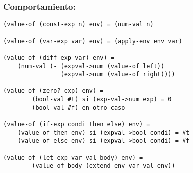 \documentclass[11pt]{article}
\begin{document}
\subsubsection*{Comportamiento:}
\begin{lstlisting}
(value-of (const-exp n) env) = (num-val n)

(value-of (var-exp var) env) = (apply-env env var)

(value-of (diff-exp var) env) = 
	(num-val (- (expval->num (value-of left))
				(expval->num (value-of right))))
				
(value-of (zero? exp) env) = 
		(bool-val #t) si (exp-val->num exp) = 0
		(bool-val #f) en otro caso		

(value-of (if-exp condi then else) env) =
	(value-of then env) si (expval->bool condi) = #t
	(value-of else env) si (expval->bool condi) = #f 	
	
(value-of (let-exp var val body) env) = 
		(value-of body (extend-env var val env))
\end{lstlisting}
\end{document}
